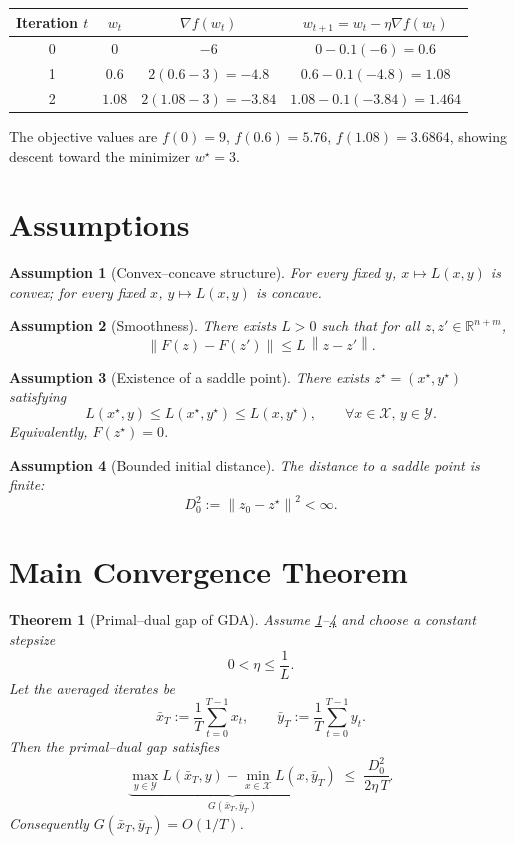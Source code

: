 \documentclass{article}
\newtheorem{theorem}{Theorem}
\newtheorem{assumption}{Assumption}
\newcommand{\F}{F}
\newcommand{\z}{z}
\newcommand{\zz}{z^{\star}}
\newcommand{\norm}[1]{\left\|#1\right\|}
\begin{document}
\begin{center}
\begin{tabular}{c|c|c|c}
Iteration $t$ & $w_{t}$ & $\nabla f(w_{t})$ & $w_{t+1}=w_{t}-\eta\nabla f(w_{t})$\\\hline
0 & $0$ & $-6$ & $0-0.1(-6)=0.6$\\
1 & $0.6$ & $2(0.6-3)=-4.8$ & $0.6-0.1(-4.8)=1.08$\\
2 & $1.08$ & $2(1.08-3)=-3.84$ & $1.08-0.1(-3.84)=1.464$\\
\end{tabular}
\end{center}
The objective values are $f(0)=9$, $f(0.6)=5.76$, $f(1.08)=3.6864$, showing descent toward the minimizer $w^{\star}=3$.

\section*{Assumptions}
\begin{assumption}[Convex–concave structure]\label{ass:cc}
For every fixed $y$, $x\mapsto L(x,y)$ is convex; for every fixed $x$, $y\mapsto L(x,y)$ is concave.
\end{assumption}
\begin{assumption}[Smoothness]\label{ass:smooth}
There exists $L>0$ such that for all $\z,\z'\in\mathbb{R}^{n+m}$,
\[
\norm{\F(\z)-\F(\z')}\le L\,\norm{\z-\z'}.
\tag{4}
\]
\end{assumption}
\begin{assumption}[Existence of a saddle point]\label{ass:saddle}
There exists $\zz=(x^{\star},y^{\star})$ satisfying
\[
L(x^{\star},y)\le L(x^{\star},y^{\star})\le L(x,y^{\star}),\qquad \forall x\in\mathcal{X},\,y\in\mathcal{Y}.
\tag{5}
\]
Equivalently, $\F(\zz)=0$.
\end{assumption}
\begin{assumption}[Bounded initial distance]\label{ass:bounded}
The distance to a saddle point is finite:
\[
D_{0}^{2}:=\norm{\z_{0}-\zz}^{2}<\infty .
\tag{6}
\]
\end{assumption}

\section*{Main Convergence Theorem}
\begin{theorem}[Primal–dual gap of GDA]\label{thm:gap}
Assume \ref{ass:cc}–\ref{ass:bounded} and choose a constant stepsize
\[
0<\eta\le \frac{1}{L}.
\tag{7}
\]
Let the averaged iterates be
\[
\bar{x}_{T}:=\frac{1}{T}\sum_{t=0}^{T-1}x_{t},
\qquad 
\bar{y}_{T}:=\frac{1}{T}\sum_{t=0}^{T-1}y_{t}.
\tag{8}
\]
Then the \emph{primal–dual gap} satisfies
\[
\underbrace{\max_{y\in\mathcal{Y}}L(\bar{x}_{T},y)
-\min_{x\in\mathcal{X}}L(x,\bar{y}_{T})}_{\displaystyle G(\bar{x}_{T},\bar{y}_{T})}
\;\le\;
\frac{D_{0}^{2}}{2\eta\,T}.
\tag{9}
\]
Consequently $G(\bar{x}_{T},\bar{y}_{T})=O(1/T)$.
\end{theorem}
\end{document}
